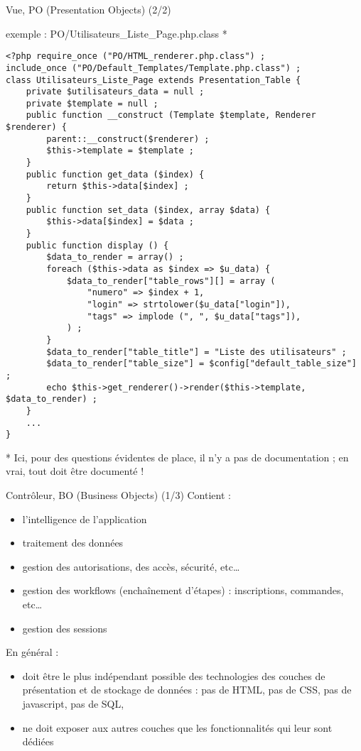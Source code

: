 \begin{frame}[containsverbatim]{Vue, PO (Presentation Objects) (2/2)}
	\begin{block}{exemple : PO/Utilisateurs\_Liste\_Page.php.class *}
		\begin{lstlisting}
<?php require_once ("PO/HTML_renderer.php.class") ;
include_once ("PO/Default_Templates/Template.php.class") ;
class Utilisateurs_Liste_Page extends Presentation_Table {
	private $utilisateurs_data = null ;
	private $template = null ;
	public function __construct (Template $template, Renderer $renderer) {
		parent::__construct($renderer) ;
		$this->template = $template ;
	}
	public function get_data ($index) { 
		return $this->data[$index] ; 
	}
	public function set_data ($index, array $data) { 
		$this->data[$index] = $data ; 
	}
	public function display () {
		$data_to_render = array() ;
		foreach ($this->data as $index => $u_data) {
			$data_to_render["table_rows"][] = array (
				"numero" => $index + 1,
				"login" => strtolower($u_data["login"]),
				"tags" => implode (", ", $u_data["tags"]),
			) ;
		}
		$data_to_render["table_title"] = "Liste des utilisateurs" ;
		$data_to_render["table_size"] = $config["default_table_size"] ;
		echo $this->get_renderer()->render($this->template, $data_to_render) ;
	}
	...
}
		\end{lstlisting}
	\end{block}
	* Ici, pour des questions évidentes de place, il n'y a pas de documentation ; en vrai, tout doit être documenté !
\end{frame}

\begin{frame}[containsverbatim]{Contrôleur, BO (Business Objects) (1/3)}
	Contient :
	\begin{itemize}
		\item l'intelligence de l'application
		\item traitement des données
		\item gestion des autorisations, des accès, sécurité, etc\ldots
		\item gestion des workflows (enchaînement d'étapes) : inscriptions, commandes, etc\ldots
		\item gestion des sessions
	\end{itemize}
	En général :
	\begin{itemize}
		\item doit être le plus indépendant possible des technologies des couches de présentation et de stockage de données : pas de HTML, pas de CSS, pas de javascript, pas de SQL,
		\item ne doit exposer aux autres couches que les fonctionnalités qui leur sont dédiées
	\end{itemize}
\end{frame}

